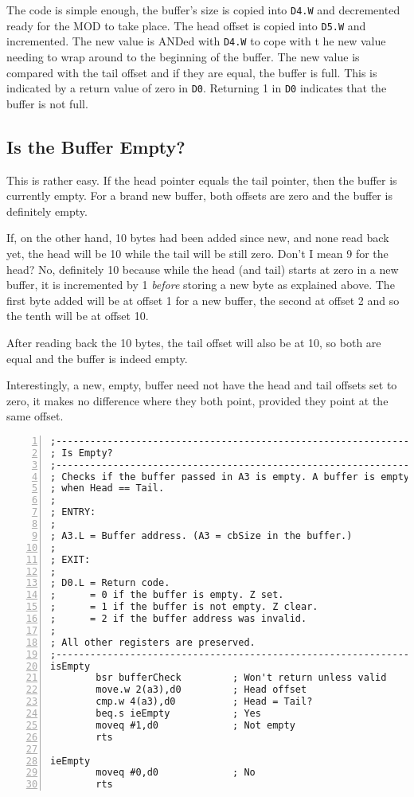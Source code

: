 The code is simple enough, the buffer's size is copied into \texttt{D4.W}
and decremented ready for the MOD to take place. The head offset is
copied into \texttt{D5.W} and incremented. The new value is ANDed
with \texttt{D4.W} to cope with t he new value needing to wrap around
to the beginning of the buffer. The new value is compared with the
tail offset and if they are equal, the buffer is full. This is indicated
by a return value of zero in \texttt{D0}. Returning 1 in \texttt{D0}
indicates that the buffer is not full.

\subsection{Is the Buffer Empty?}

This is rather easy. If the head pointer equals the tail pointer,
then the buffer is currently empty. For a brand new buffer, both offsets
are zero and the buffer is definitely empty.

If, on the other hand, 10 bytes had been added since new, and none
read back yet, the head will be 10 while the tail will be still zero.
Don't I mean 9 for the head? No, definitely 10 because while the head
(and tail) starts at zero in a new buffer, it is incremented by 1
\emph{before} storing a new byte as explained above. The first byte
added will be at offset 1 for a new buffer, the second at offset 2
and so the tenth will be at offset 10.

After reading back the 10 bytes, the tail offset will also be at 10,
so both are equal and the buffer is indeed empty.

Interestingly, a new, empty, buffer need not have the head and tail
offsets set to zero, it makes no difference where they both point,
provided they point at the same offset.

\begin{lstlisting}[caption={Is buffer empty},label={lis:Is-buffer-empty},numbers=left,showstringspaces=false,tabsize=4]
;--------------------------------------------------------------
; Is Empty?
;--------------------------------------------------------------
; Checks if the buffer passed in A3 is empty. A buffer is empty 
; when Head == Tail.
; 
; ENTRY:
;
; A3.L = Buffer address. (A3 = cbSize in the buffer.)
;
; EXIT:
;
; D0.L = Return code.
;      = 0 if the buffer is empty. Z set.
;      = 1 if the buffer is not empty. Z clear.
;      = 2 if the buffer address was invalid.
;
; All other registers are preserved.
;--------------------------------------------------------------
isEmpty
        bsr bufferCheck         ; Won't return unless valid
        move.w 2(a3),d0         ; Head offset
        cmp.w 4(a3),d0          ; Head = Tail?
        beq.s ieEmpty           ; Yes
        moveq #1,d0             ; Not empty
        rts

ieEmpty
        moveq #0,d0             ; No
        rts

\end{lstlisting}


